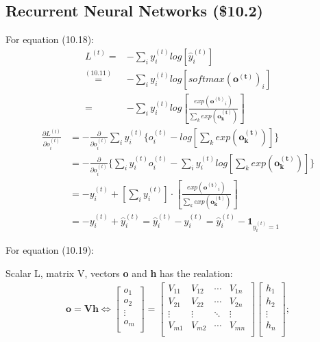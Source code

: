 \documentclass[12pt]{article}
\numberwithin{equation}{section}
\begin{document}
\subsection{Recurrent Neural Networks (\$10.2)}
For equation (10.18):
\begin{equation}\begin{split}
	L^{(t)} =& -\sum_{i}y_{i}^{(t)}log[\hat{y}_{i}^{(t)}] \\
	\overset{(10.11)}{=}& -\sum_{i}y_{i}^{(t)}log[softmax(\mathbf{o^{(t)}})_{i}] \\
	=& -\sum_{i}y_{i}^{(t)}log[\frac{exp(\mathbf{o^{(t)}}_{i})}{\sum_{k}exp(\mathbf{o^{(t)}_{k}})}]
\end{split}\end{equation}
\begin{equation}\begin{split}
	\frac{\partial L^{(t)}}{\partial o_i^{(t)}}
	&=-\frac{\partial}{\partial o_i^{(t)}} \sum_{i}y_{i}^{(t)} \{o_i^{(t)}-log[\sum_{k}exp(\mathbf{o^{(t)}_{k}})] \}\\
	&=-\frac{\partial}{\partial o_i^{(t)}} \{\sum_{i}y_{i}^{(t)} o_i^{(t)}-\sum_{i}y_{i}^{(t)} log[\sum_{k}exp(\mathbf{o^{(t)}_{k}})] \}\\
	&=-y_{i}^{(t)} + [\sum_{i}y_{i}^{(t)}] \cdot [\frac{exp(\mathbf{o^{(t)}}_{i})}{\sum_{k}exp(\mathbf{o^{(t)}_{k}})}]\\
	&=-y_{i}^{(t)} + \hat{y}_{i}^{(t)} = \hat{y}_{i}^{(t)} - y_{i}^{(t)} =  \hat{y}_{i}^{(t)} - \mathbf{1}_{y_{i}^{(t)}=1}
\end{split}\end{equation} \par
For equation (10.19): \par
Scalar L, matrix V, vectors \textbf{o} and \textbf{h} has the realation:  
\begin{equation}\begin{split}
	\mathbf{o}=\mathbf{Vh} \Leftrightarrow
	\begin{bmatrix}
		o_1\\ o_2\\ \vdots\\ o_m\\
	\end{bmatrix}=
	\begin{bmatrix}
		V_{11} & V_{12} & \cdots & V_{1n}\\
		V_{21} & V_{22} & \cdots & V_{2n}\\
		\vdots & \vdots & \ddots & \vdots\\
		V_{m1} & V_{m2} & \cdots & V_{mn}\\
	\end{bmatrix}
	\begin{bmatrix}
		h_1\\ h_2\\ \vdots\\ h_n\\
	\end{bmatrix};
\end{split}\end{equation}
\end{document}
